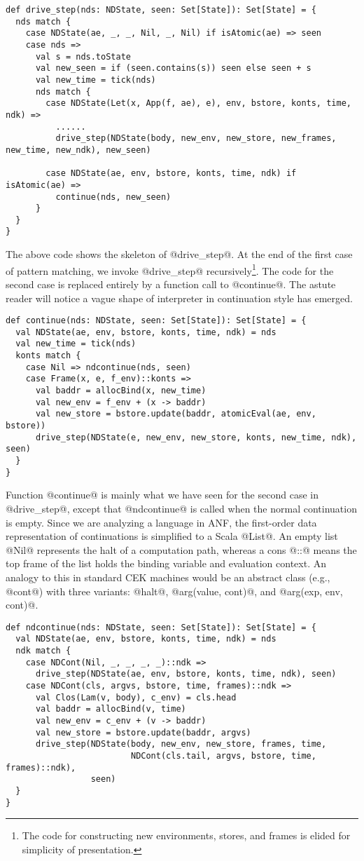 \documentclass[acmsmall]{acmart}\settopmatter{}
\begin{document}
\begin{lstlisting}
def drive_step(nds: NDState, seen: Set[State]): Set[State] = {
  nds match {
    case NDState(ae, _, _, Nil, _, Nil) if isAtomic(ae) => seen
    case nds =>
      val s = nds.toState
      val new_seen = if (seen.contains(s)) seen else seen + s
      val new_time = tick(nds)
      nds match {
        case NDState(Let(x, App(f, ae), e), env, bstore, konts, time, ndk) =>
          ......
          drive_step(NDState(body, new_env, new_store, new_frames, new_time, new_ndk), new_seen)

        case NDState(ae, env, bstore, konts, time, ndk) if isAtomic(ae) =>
          continue(nds, new_seen)
      }
  }
}
\end{lstlisting}

The above code shows the skeleton of @drive_step@.
At the end of the first case of pattern matching, we invoke @drive_step@ recursively\footnote{The code for constructing new environments, stores, and frames is elided for simplicity of presentation.}.
The code for the second case is replaced entirely by a function call to @continue@.
The astute reader will notice a vague shape of interpreter in continuation style has emerged.

\begin{lstlisting}
def continue(nds: NDState, seen: Set[State]): Set[State] = {
  val NDState(ae, env, bstore, konts, time, ndk) = nds
  val new_time = tick(nds)
  konts match {
    case Nil => ndcontinue(nds, seen)
    case Frame(x, e, f_env)::konts =>
      val baddr = allocBind(x, new_time)
      val new_env = f_env + (x -> baddr)
      val new_store = bstore.update(baddr, atomicEval(ae, env, bstore))
      drive_step(NDState(e, new_env, new_store, konts, new_time, ndk), seen)
  }
}
\end{lstlisting}

Function @continue@ is mainly what we have seen for the second case in
@drive_step@, except that @ndcontinue@ is called when
the normal continuation is empty.
Since we are analyzing a language in ANF, the first-order data representation of
continuations is simplified to a Scala @List@.
An empty list @Nil@ represents the halt of a computation path, whereas
a cons @::@ means the top frame of the list holds the binding variable and
evaluation context.
An analogy to this in standard CEK machines would be an abstract class (e.g., @cont@) with
three variants: @halt@, @arg(value, cont)@, and @arg(exp, env, cont)@.

\begin{lstlisting}
def ndcontinue(nds: NDState, seen: Set[State]): Set[State] = {
  val NDState(ae, env, bstore, konts, time, ndk) = nds
  ndk match {
    case NDCont(Nil, _, _, _, _)::ndk =>
      drive_step(NDState(ae, env, bstore, konts, time, ndk), seen)
    case NDCont(cls, argvs, bstore, time, frames)::ndk =>
      val Clos(Lam(v, body), c_env) = cls.head
      val baddr = allocBind(v, time)
      val new_env = c_env + (v -> baddr)
      val new_store = bstore.update(baddr, argvs)
      drive_step(NDState(body, new_env, new_store, frames, time,
                         NDCont(cls.tail, argvs, bstore, time, frames)::ndk),
                 seen)
  }
}
\end{lstlisting}
\end{document}
